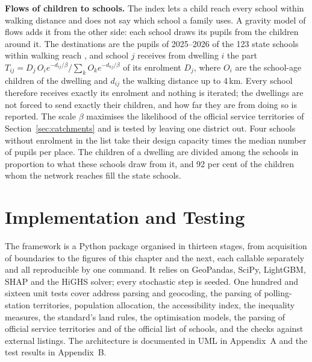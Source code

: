 \textbf{Flows of children to schools.}\label{sec:method-flows} The index lets a child reach every school within walking distance and does not say which school a family uses. A gravity model of flows adds it from the other side: each school draws its pupils from the children around it. The destinations are the pupils of 2025--2026 of the 123 state schools within walking reach \cite{schoolregister2026}, and school $j$ receives from dwelling $i$ the part $T_{ij}=D_j\,O_i e^{-d_{ij}/\beta}\big/\sum_k O_k e^{-d_{kj}/\beta}$ of its enrolment $D_j$, where $O_i$ are the school-age children of the dwelling and $d_{ij}$ the walking distance up to 4\,km. Every school therefore receives exactly its enrolment and nothing is iterated; the dwellings are not forced to send exactly their children, and how far they are from doing so is reported. The scale $\beta$ maximises the likelihood of the official service territories of Section~\ref{sec:catchments} and is tested by leaving one district out. Four schools without enrolment in the list take their design capacity times the median number of pupils per place. The children of a dwelling are divided among the schools in proportion to what these schools draw from it, and 92 per cent of the children whom the network reaches fill the state schools.

\section{Implementation and Testing}
\label{sec:implementation}

The framework is a Python package organised in thirteen stages, from acquisition of boundaries to the figures of this chapter and the next, each callable separately and all reproducible by one command. It relies on GeoPandas, SciPy, LightGBM, SHAP and the HiGHS solver; every stochastic step is seeded. One hundred and sixteen unit tests cover address parsing and geocoding, the parsing of polling-station territories, population allocation, the accessibility index, the inequality measures, the standard's land rules, the optimisation models, the parsing of official service territories and of the official list of schools, and the checks against external listings. The architecture is documented in UML in Appendix~A and the test results in Appendix~B.
